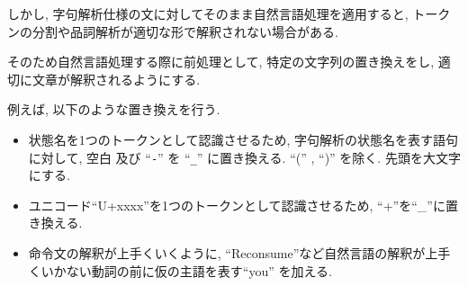 \documentclass[10pt,twocolumn,uplatex,a4j]{jsreport}
\begin{document}
しかし, 字句解析仕様の文に対してそのまま自然言語処理を適用すると, トークンの分割や品詞解析が適切な形で解釈されない場合がある. 

そのため自然言語処理する際に前処理として, 特定の文字列の置き換えをし, 適切に文章が解釈されるようにする. 

例えば, 以下のような置き換えを行う. 
\begin{itemize}
    \item 状態名を1つのトークンとして認識させるため, 字句解析の状態名を表す語句に対して, 空白 及び ``\texttt{-}'' を ``\texttt{_}'' に置き換える. ``('' , ``)'' を除く. 先頭を大文字にする.
    \item ユニコード``U+xxxx''を1つのトークンとして認識させるため, ``+''を``\_''に置き換える. 
    \item 命令文の解釈が上手くいくように, ``Reconsume''など自然言語の解釈が上手くいかない動詞の前に仮の主語を表す``you'' を加える. 
 \end{itemize}
\end{document}
